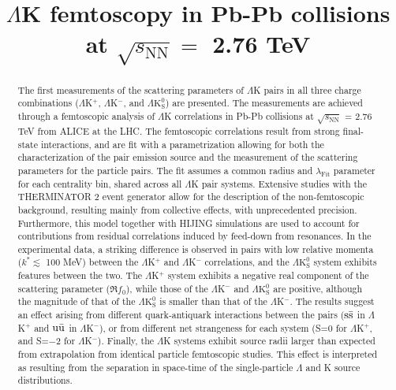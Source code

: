 \documentclass[ALICE,manyauthors]{cernphprep}
\newcommand{\LamK}{$\Lambda$K\xspace}
\begin{document}
%

\begin{titlepage}
%
%

\title{\LamK femtoscopy in Pb-Pb collisions at $\sqrt{s_{\mathrm{NN}}} = $ 2.76 TeV}
\ShortTitle{\LamK femtoscopy in Pb-Pb collisions}   %


\begin{abstract}
The first measurements of the scattering parameters of $\Lambda$K pairs in all three charge combinations ($\Lambda$K$^{+}$, $\Lambda$K$^{-}$, and $\Lambda\mathrm{K^{0}_{S}}$) are presented.
The measurements are achieved through a femtoscopic analysis of $\Lambda$K correlations in Pb-Pb collisions at $\sqrt{s_{\mathrm{NN}}}$ = 2.76 TeV from ALICE at the LHC.  
The femtoscopic correlations result from strong final-state interactions, and are fit with a parametrization allowing for both the characterization of the pair emission source and the measurement of the scattering parameters for the particle pairs.
The fit assumes a common radius and $\lambda_{\mathrm{Fit}}$ parameter for each centrality bin, shared across all \LamK pair systems.
Extensive studies with the THERMINATOR 2 event generator allow for the description of the non-femtoscopic background, resulting mainly from collective effects, with unprecedented precision.
Furthermore, this model together with HIJING simulations are used to account for contributions from residual correlations induced by feed-down from resonances.
In the experimental data, a striking difference is observed in pairs with low relative momenta ($k^{*}\lesssim$ 100 MeV) between the $\Lambda$K$^{+}$ and $\Lambda$K$^{-}$ correlations, and the $\Lambda\mathrm{K^{0}_{S}}$ system exhibits features between the two.
The $\Lambda$K$^{+}$ system exhibits a negative real component of the scattering parameter ($\Re f_{0}$), while those of the $\Lambda$K$^{-}$ and $\Lambda\mathrm{K^{0}_{S}}$ are positive, although the magnitude of that of the $\Lambda\mathrm{K^{0}_{S}}$ is smaller than that of the $\Lambda$K$^{-}$.
The results suggest an effect arising from different quark-antiquark interactions between the pairs ($\rm s\bar{s}$ in $\Lambda$K$^{+}$ and $\rm u\bar{u}$ in $\Lambda$K$^{-}$), or from different net strangeness for each system (S=0 for $\Lambda$K$^{+}$, and S=$-2$ for $\Lambda$K$^{-}$).
Finally, the $\Lambda$K systems exhibit source radii larger than expected from extrapolation from identical particle femtoscopic studies.
This effect is interpreted as resulting from the separation in space-time of the single-particle $\Lambda$ and K source distributions.
\end{abstract}
\end{titlepage}
\end{document}
